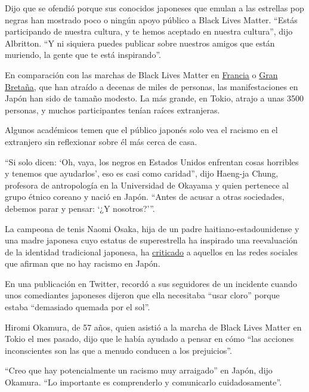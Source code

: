 Dijo que se ofendió porque sus conocidos japoneses que emulan a las
estrellas pop negras han mostrado poco o ningún apoyo público a Black
Lives Matter. ``Estás participando de nuestra cultura, y te hemos
aceptado en nuestra cultura'', dijo Albritton. ``Y ni siquiera puedes
publicar sobre nuestros amigos que están muriendo, la gente que te está
inspirando''.

En comparación con las marchas de Black Lives Matter en
\href{https://www.nytimes3xbfgragh.onion/es/2020/06/20/espanol/mundo/protestas-racismo-francia.html}{Francia}
o
\href{https://www.nytimes3xbfgragh.onion/2020/06/06/world/george-floyd-global-protests.html}{Gran
Bretaña}, que han atraído a decenas de miles de personas, las
manifestaciones en Japón han sido de tamaño modesto. La más grande, en
Tokio, atrajo a unas 3500 personas, y muchos participantes tenían raíces
extranjeras.

Algunos académicos temen que el público japonés solo vea el racismo en
el extranjero sin reflexionar sobre él más cerca de casa.

``Si solo dicen: `Oh, vaya, los negros en Estados Unidos enfrentan cosas
horribles y tenemos que ayudarlos', eso es casi como caridad'', dijo
Haeng-ja Chung, profesora de antropología en la Universidad de Okayama y
quien pertenece al grupo étnico coreano y nació en Japón. ``Antes de
acusar a otras sociedades, debemos parar y pensar: `¿Y nosotros?'''.

La campeona de tenis Naomi Osaka, hija de un padre
haitiano-estadounidense y una madre japonesa cuyo estatus de
superestrella ha inspirado una reevaluación de la identidad tradicional
japonesa, ha
\href{https://www.washingtonpost.com/world/asia_pacific/japanese-tennis-player-naomi-osaka-speaks-out-for-black-lives-matter-faces-backlash/2020/06/08/f8432ca0-a92f-11ea-a43b-be9f6494a87d_story.html}{criticado}
a aquellos en las redes sociales que afirman que no hay racismo en
Japón.

En una publicación en Twitter, recordó a sus seguidores de un incidente
cuando unos comediantes japoneses dijeron que ella necesitaba ``usar
cloro'' porque estaba ``demasiado quemada por el sol''.

Hiromi Okamura, de 57 años, quien asistió a la marcha de Black Lives
Matter en Tokio el mes pasado, dijo que le había ayudado a pensar en
cómo ``las acciones inconscientes son las que a menudo conducen a los
prejuicios''.

``Creo que hay potencialmente un racismo muy arraigado'' en Japón, dijo
Okamura. ``Lo importante es comprenderlo y comunicarlo cuidadosamente''.

